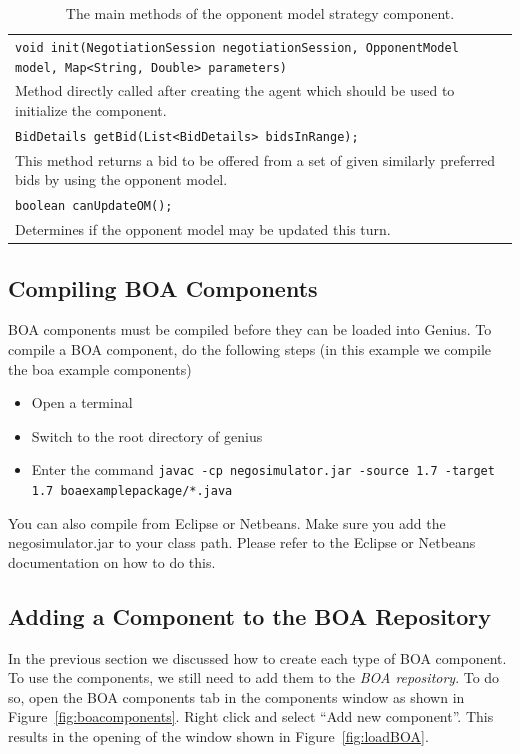 \documentclass[]{article}
\begin{document}
\begin{table}[h]
\begin{tabular}{m{}}
\hline
\texttt{void init(NegotiationSession negotiationSession, OpponentModel model, Map<String, Double> parameters)}\\
Method directly called after creating the agent which should be used to initialize the component.\\
\hline
\texttt{BidDetails getBid(List<BidDetails> bidsInRange);}\\
This method returns a bid to be offered from a set of given similarly preferred bids by using the opponent model.\\
\hline
\texttt{boolean canUpdateOM();}\\
Determines if the opponent model may be updated this turn.\\
\hline
\end{tabular}
\caption{The main methods of the opponent model strategy component.}
\label{tab:BOAoms}
\end{table}

\subsection{Compiling BOA Components}
BOA components must be compiled before they can be loaded into Genius.
To compile a BOA component, do the following steps (in this example we compile the boa example components)
\begin{itemize}
\item Open a terminal 
\item Switch to the root directory of genius
\item \raggedright Enter the command \verb|javac -cp negosimulator.jar -source 1.7 -target 1.7 boaexamplepackage/*.java |
\end{itemize}

You can also compile from Eclipse or Netbeans. Make sure you add the negosimulator.jar to your class path. Please refer to the Eclipse or Netbeans documentation on how to do this.


\subsection{Adding a Component to the BOA Repository}
In the previous section we discussed how to create each type of BOA component. To use the components, we still need to add them to the \textit{BOA repository}. To do so, open the BOA components tab in the components window as shown in Figure~\ref{fig:boacomponents}. Right click and select ``Add new component''. This results in the opening of the window shown in Figure~\ref{fig:loadBOA}.
\end{document}
